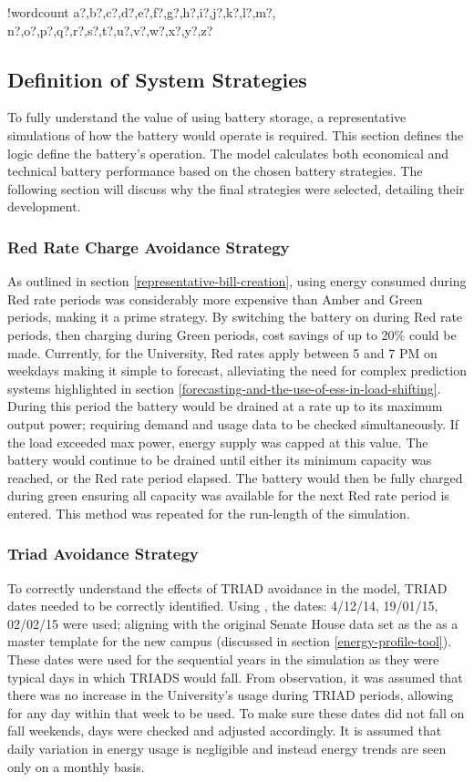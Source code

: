 \documentclass[fontsize=9.5pt]{extarticle}
\numberwithin{figure}{section} %
\newcounter{words}
\newenvironment{counted}{%
  \setcounter{words}{0}
  \SearchList!{wordcount}{\stepcounter{words}}
    {a?,b?,c?,d?,e?,f?,g?,h?,i?,j?,k?,l?,m?,
    n?,o?,p?,q?,r?,s?,t?,u?,v?,w?,x?,y?,z?}
  \UndoBoundary{'}
  \SearchOrder{p;}}{%
  \StopSearching}
\begin{document}
\begin{counted}
\subsection{Definition of System
Strategies}\label{definition-of-system-strategies}

To fully understand the value of using battery storage, a representative
simulations of how the battery would operate is required. This section
defines the logic define the battery's operation. The model calculates
both economical and technical battery performance based on the chosen
battery strategies. The following section will discuss why the final
strategies were selected, detailing their development.

\subsubsection{Red Rate Charge Avoidance
Strategy}\label{red-rate-charge-avoidance-strategy}

As outlined in section \ref{representative-bill-creation}, using energy
consumed during Red rate periods was considerably more expensive than
Amber and Green periods, making it a prime strategy. By switching the
battery on during Red rate periods, then charging during Green periods,
cost savings of up to 20\% could be made. Currently, for the University,
Red rates apply between 5 and 7 PM on weekdays making it simple to
forecast, alleviating the need for complex prediction systems
highlighted in section
\ref{forecasting-and-the-use-of-ess-in-load-shifting}. During this
period the battery would be drained at a rate up to its maximum output
power; requiring demand and usage data to be checked simultaneously. If
the load exceeded max power, energy supply was capped at this value. The
battery would continue to be drained until either its minimum capacity
was reached, or the Red rate period elapsed. The battery would then be
fully charged during green ensuring all capacity was available for the
next Red rate period is entered. This method was repeated for the
run-length of the simulation.

\subsubsection{Triad Avoidance Strategy}\label{triad-avoidance-strategy}

To correctly understand the effects of TRIAD avoidance in the model,
TRIAD dates needed to be correctly identified. Using \autocite{triad15},
the dates: 4/12/14, 19/01/15, 02/02/15 were used; aligning with the
original Senate House data set as the as a master template for the new
campus (discussed in section \ref{energy-profile-tool}). These dates
were used for the sequential years in the simulation as they were
typical days in which TRIADS would fall. From observation, it was
assumed that there was no increase in the University's usage during
TRIAD periods, allowing for any day within that week to be used. To make
sure these dates did not fall on fall weekends, days were checked and
adjusted accordingly. It is assumed that daily variation in energy usage
is negligible and instead energy trends are seen only on a monthly
basis.


\end{counted}
\end{document}
